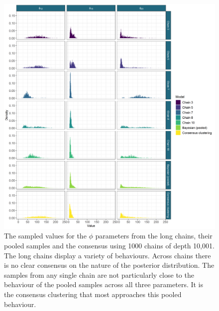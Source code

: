 \documentclass{bmcart}
\begin{document}
\begin{figure}
    \centering
    \includegraphics[scale=0.45]{./Images/Yeast/ComparisonDensitiesNoTitle.png}
    \caption{The sampled values for the $\phi$ parameters from the long chains, their pooled samples and the consensus using 1000 chains of depth 10,001. The long chains display a variety of behaviours. Across chains there is no clear consensus on the nature of the posterior distribution. The samples from any single chain are not particularly close to the behaviour of the pooled samples across all three parameters. It is the consensus clustering that most approaches this pooled behaviour.}
    \label{fig:densityComparison}
\end{figure}

\end{document}
